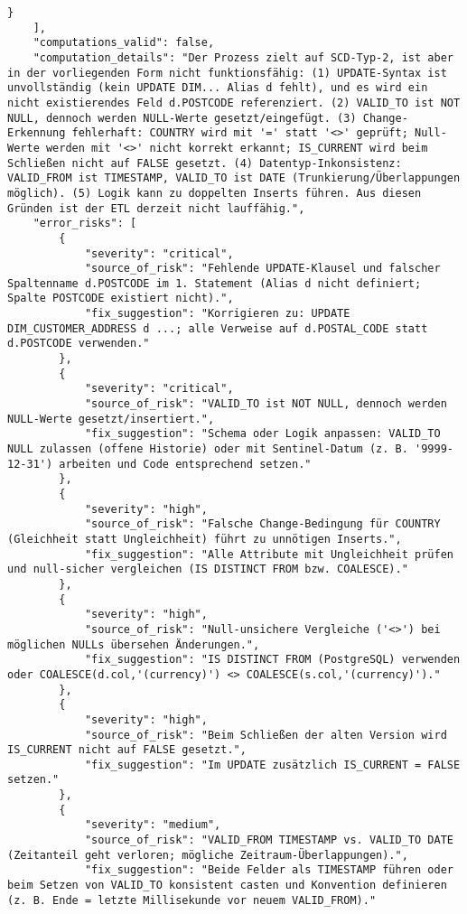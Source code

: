 \begin{lstlisting}[caption={Ausgabe: GPT-5 Anwendungsfall 9 Robustheitsdurchlauf},label={gpt_case9_prompt3}]
        }
    ],
    "computations_valid": false,
    "computation_details": "Der Prozess zielt auf SCD-Typ-2, ist aber in der vorliegenden Form nicht funktionsfähig: (1) UPDATE-Syntax ist unvollständig (kein UPDATE DIM... Alias d fehlt), und es wird ein nicht existierendes Feld d.POSTCODE referenziert. (2) VALID_TO ist NOT NULL, dennoch werden NULL-Werte gesetzt/eingefügt. (3) Change-Erkennung fehlerhaft: COUNTRY wird mit '=' statt '<>' geprüft; Null-Werte werden mit '<>' nicht korrekt erkannt; IS_CURRENT wird beim Schließen nicht auf FALSE gesetzt. (4) Datentyp-Inkonsistenz: VALID_FROM ist TIMESTAMP, VALID_TO ist DATE (Trunkierung/Überlappungen möglich). (5) Logik kann zu doppelten Inserts führen. Aus diesen Gründen ist der ETL derzeit nicht lauffähig.",
    "error_risks": [
        {
            "severity": "critical",
            "source_of_risk": "Fehlende UPDATE-Klausel und falscher Spaltenname d.POSTCODE im 1. Statement (Alias d nicht definiert; Spalte POSTCODE existiert nicht).",
            "fix_suggestion": "Korrigieren zu: UPDATE DIM_CUSTOMER_ADDRESS d ...; alle Verweise auf d.POSTAL_CODE statt d.POSTCODE verwenden."
        },
        {
            "severity": "critical",
            "source_of_risk": "VALID_TO ist NOT NULL, dennoch werden NULL-Werte gesetzt/insertiert.",
            "fix_suggestion": "Schema oder Logik anpassen: VALID_TO NULL zulassen (offene Historie) oder mit Sentinel-Datum (z. B. '9999-12-31') arbeiten und Code entsprechend setzen."
        },
        {
            "severity": "high",
            "source_of_risk": "Falsche Change-Bedingung für COUNTRY (Gleichheit statt Ungleichheit) führt zu unnötigen Inserts.",
            "fix_suggestion": "Alle Attribute mit Ungleichheit prüfen und null-sicher vergleichen (IS DISTINCT FROM bzw. COALESCE)."
        },
        {
            "severity": "high",
            "source_of_risk": "Null-unsichere Vergleiche ('<>') bei möglichen NULLs übersehen Änderungen.",
            "fix_suggestion": "IS DISTINCT FROM (PostgreSQL) verwenden oder COALESCE(d.col,'(currency)') <> COALESCE(s.col,'(currency)')."
        },
        {
            "severity": "high",
            "source_of_risk": "Beim Schließen der alten Version wird IS_CURRENT nicht auf FALSE gesetzt.",
            "fix_suggestion": "Im UPDATE zusätzlich IS_CURRENT = FALSE setzen."
        },
        {
            "severity": "medium",
            "source_of_risk": "VALID_FROM TIMESTAMP vs. VALID_TO DATE (Zeitanteil geht verloren; mögliche Zeitraum-Überlappungen).",
            "fix_suggestion": "Beide Felder als TIMESTAMP führen oder beim Setzen von VALID_TO konsistent casten und Konvention definieren (z. B. Ende = letzte Millisekunde vor neuem VALID_FROM)."

\end{lstlisting}
